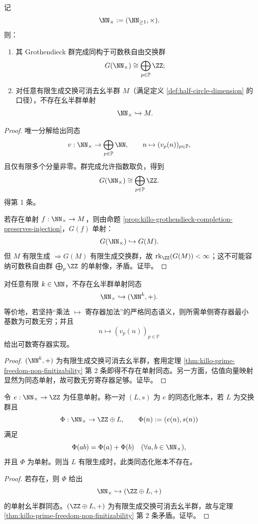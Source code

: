 \begin{theorem}[素数自由度导致结构半圆维不可有限化]\label{thm:killo-prime-freedom-non-finitizability}
记
\[
\NN_{\times}:=(\NN_{\ge 1},\times).
\]
则：
\begin{enumerate}
  \item 其 Grothendieck 群完成同构于可数秩自由交换群
  \[
  G(\NN_{\times})\cong \bigoplus_{p\in\mathbb P}\ZZ;
  \]
  \item 对任意有限生成交换可消去幺半群 \(M\)（满足定义 \ref{def:half-circle-dimension} 的口径），不存在幺半群单射
  \[
  \NN_{\times}\hookrightarrow M.
  \]
\end{enumerate}
\end{theorem}
\begin{proof}
唯一分解给出同态
\[
v:\NN_{\times}\to \bigoplus_{p\in\mathbb P}\NN,\qquad
n\mapsto (v_p(n))_{p\in\mathbb P},
\]
且仅有限多个分量非零。群完成允许指数取负，得到
\[
G(\NN_{\times})\cong \bigoplus_{p\in\mathbb P}\ZZ.
\]
得第 1 条。

若存在单射 \(f:\NN_{\times}\to M\)，则由命题 \ref{prop:killo-grothendieck-completion-preserves-injection}，\(G(f)\) 单射：
\[
G(\NN_{\times})\hookrightarrow G(M).
\]
但 \(M\) 有限生成 \(\Rightarrow G(M)\) 有限生成交换群，故 \(\operatorname{rk}_{\ZZ}(G(M))<\infty\)；这不可能容纳可数秩自由群 \(\bigoplus_{p}\ZZ\) 的单射像，矛盾。证毕。
\end{proof}

\begin{corollary}[乘法到有限寄存器加法的同态线性化不可能性]\label{cor:killo-no-finite-additive-register-linearization}
对任意有限 \(k\in\NN\)，不存在幺半群单射同态
\[
\NN_{\times}\hookrightarrow (\NN^k,+).
\]
等价地，若坚持“乘法 \(\mapsto\) 寄存器加法”的严格同态语义，则所需单侧寄存器最小基数为可数无穷；并且
\[
n\longmapsto (v_p(n))_{p\in\mathbb P}
\]
给出可数寄存器实现。
\end{corollary}
\begin{proof}
\((\NN^k,+)\) 为有限生成交换可消去幺半群，套用定理 \ref{thm:killo-prime-freedom-non-finitizability} 第 2 条即得不存在单射同态。另一方面，估值向量映射显然为同态单射，故可数无穷寄存器足够。证毕。
\end{proof}

\begin{theorem}\label{thm:killo-godel-compression-not-finite-rank-homologizable}
令 \(e:\NN_{\times}\to\ZZ\) 为任意单射。称一对 \((L,s)\) 为 \(e\) 的同态化账本，若 \(L\) 为交换群且
\[
\Phi:\NN_{\times}\to \ZZ\oplus L,\qquad \Phi(n):=(e(n),s(n))
\]
满足
\[
\Phi(ab)=\Phi(a)+\Phi(b)\quad(\forall a,b\in\NN_{\times}),
\]
并且 \(\Phi\) 为单射。则当 \(L\) 有限生成时，此类同态化账本不存在。
\end{theorem}
\begin{proof}
若存在，则 \(\Phi\) 给出
\[
\NN_{\times}\hookrightarrow (\ZZ\oplus L,+)
\]
的单射幺半群同态。\((\ZZ\oplus L,+)\) 为有限生成交换可消去幺半群，故与定理 \ref{thm:killo-prime-freedom-non-finitizability} 第 2 条矛盾。证毕。
\end{proof}

